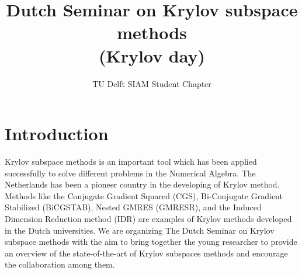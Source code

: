 \documentclass{article}
\title{Dutch Seminar on Krylov subspace methods \\(Krylov day)}
\author{TU Delft SIAM Student Chapter}
\begin{document}
\maketitle
\section{Introduction}
Krylov subspace methods is an important tool which has been applied successfully to solve different problems 
in the Numerical Algebra. The Netherlands has been a pioneer country in the developing of Krylov method.
Methods like the Conjugate Gradient Squared (CGS), Bi-Conjugate Gradient Stabilized (BiCGSTAB), Nested GMRES (GMRESR), and the Induced Dimension Reduction method (IDR)  
are examples of Krylov methods developed in the Dutch universities. 
We are organizing The Dutch Seminar on Krylov subspace methods with the aim 
to bring together the young researcher to provide an
overview of the state-of-the-art of Krylov subspaces methods and encourage 
the collaboration among them.
\newpage
\end{document}
